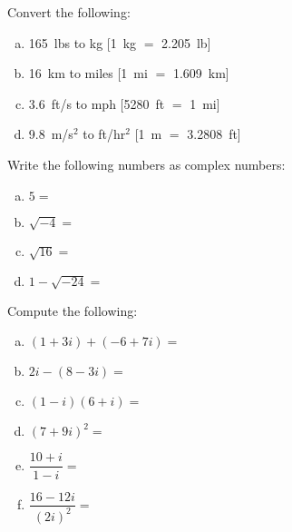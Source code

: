 \documentclass[11pt,letterpaper]{article}
\begin{document}
 Convert the following:
\begin{enumerate}[(a)]
\item 165~lbs to kg [1~kg $=$ 2.205~lb] \vfill
\item 16~km to miles [1~mi $=$ 1.609~km] \vfill
\item 3.6~ft/s to mph [5280~ft $=$ 1~mi] \vfill
\item 9.8~m/s$^2$ to ft/hr$^2$ [1~m $=$ 3.2808~ft] \vfill
\end{enumerate}



\newpage



 Write the following numbers as complex numbers:
\begin{enumerate}[(a)]
\item $5=$ \vfill
\item $\sqrt{-4}=$ \vfill
\item $\sqrt{16}=$ \vfill
\item $1 - \sqrt{-24}=$ \vfill
\end{enumerate}



 Compute the following:
\begin{enumerate}[(a)]
\item $(1 + 3i) + (-6 + 7i)=$ \vfill
\item $2i - (8 - 3i)=$ \vfill
\item $(1 - i)(6 + i)=$ \vfill
\item $(7 + 9i)^2=$ \vfill
\item $\dfrac{10 + i}{1 - i}=$ \vfill
\item $\dfrac{16 - 12i}{(2i)^2}=$ \vfill
\end{enumerate}


\end{document}
